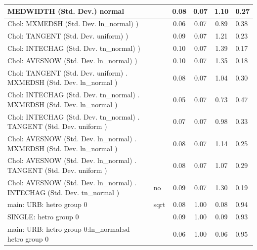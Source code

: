 \begin{table}
\begin{center}
\begin{tabular}{|l|l|c|c|c|l|}
			\hline
			MEDWIDTH (Std. Dev.) normal &  & 0.08 & 0.07 & 1.10 & 0.27 \\
			\hline
			 Chol: MXMEDSH (Std. Dev. ln_normal) ) &  & 0.06 & 0.07 & 0.89 & 0.38 \\
			\hline
			 Chol: TANGENT (Std. Dev. uniform) ) &  & 0.09 & 0.07 & 1.21 & 0.23 \\
			\hline
			 Chol: INTECHAG (Std. Dev. tn_normal) ) &  & 0.10 & 0.07 & 1.39 & 0.17 \\
			\hline
			 Chol: AVESNOW (Std. Dev. ln_normal) ) &  & 0.10 & 0.07 & 1.35 & 0.18 \\
			\hline
			 Chol: TANGENT (Std. Dev. uniform) . MXMEDSH (Std. Dev.   ln_normal ) &  & 0.08 & 0.07 & 1.04 & 0.30 \\
			\hline
			 Chol: INTECHAG (Std. Dev. tn_normal) . MXMEDSH (Std. Dev.   ln_normal ) &  & 0.05 & 0.07 & 0.73 & 0.47 \\
			\hline
			 Chol: INTECHAG (Std. Dev. tn_normal) . TANGENT (Std. Dev.   uniform ) &  & 0.07 & 0.07 & 0.98 & 0.33 \\
			\hline
			 Chol: AVESNOW (Std. Dev. ln_normal) . MXMEDSH (Std. Dev.   ln_normal ) &  & 0.08 & 0.07 & 1.14 & 0.25 \\
			\hline
			 Chol: AVESNOW (Std. Dev. ln_normal) . TANGENT (Std. Dev.   uniform ) &  & 0.08 & 0.07 & 1.07 & 0.29 \\
			\hline
			 Chol: AVESNOW (Std. Dev. ln_normal) . INTECHAG (Std. Dev.   tn_normal ) & no & 0.09 & 0.07 & 1.30 & 0.19 \\
			\hline
			main: URB: hetro group 0 & sqrt & 0.08 & 1.00 & 0.08 & 0.94 \\
			\hline
			SINGLE: hetro group 0 &  & 0.09 & 1.00 & 0.09 & 0.93 \\
			\hline
			main: URB: hetro group 0:ln_normal:sd  hetro group 0 &  & 0.06 & 1.00 & 0.06 & 0.95 \\
			\hline
		\end{tabular}
	\end{center}
\end{table}